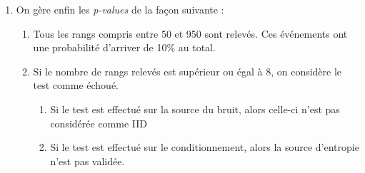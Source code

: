 \begin{enumerate}
\item On gère enfin les \textit{p-values} de la façon suivante : 
	\begin{enumerate}
	\item Tous les rangs compris entre 50 et 950 sont relevés. Ces événements ont une probabilité d'arriver de 10\% au total. 
	\item Si le nombre de rangs relevés est supérieur ou égal à 8, on considère le test comme échoué.
		\begin{enumerate}
		\item Si le test est effectué sur la source du bruit, alors celle-ci n'est pas considérée comme IID
		\item Si le test est effectué sur le conditionnement, alors la source d'entropie n'est pas validée.
		\end{enumerate}
	\end{enumerate}
\end{enumerate}

